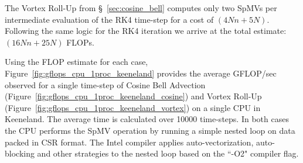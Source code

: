 The Vortex Roll-Up from \S~\ref{sec:cosine_bell} computes only two SpMVs per intermediate evaluation of the RK4 time-step for a cost of $(4Nn + 5N)$. Following the same logic for the RK4 iteration we arrive at the total estimate: $(16Nn + 25N)$ FLOPs. 

Using the FLOP estimate for each case, Figure~\ref{fig:gflops_cpu_1proc_keeneland} provides the average GFLOP/sec observed for a single time-step of Cosine Bell Advection (Figure~\ref{fig:gflops_cpu_1proc_keeneland_cosine}) and Vortex Roll-Up (Figure~\ref{fig:gflops_cpu_1proc_keeneland_vortex}) on a single CPU in Keeneland. The average time is calculated over 10000 time-steps. In both cases the CPU performs the SpMV operation by running a simple nested loop on data packed in CSR format. The Intel compiler applies auto-vectorization, auto-blocking and other strategies to the nested loop based on the ``-O2" compiler flag. 



